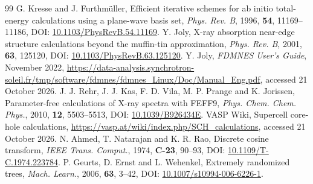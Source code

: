 \begin{thebibliography}{99}
 G. Kresse and J. Furthm\"uller, Efficient iterative schemes for ab initio total-energy calculations using a plane-wave basis set, \textit{Phys. Rev. B}, 1996, \textbf{54}, 11169--11186, DOI: \href{https://doi.org/10.1103/PhysRevB.54.11169}{10.1103/PhysRevB.54.11169}.
 Y. Joly, X-ray absorption near-edge structure calculations beyond the muffin-tin approximation, \textit{Phys. Rev. B}, 2001, \textbf{63}, 125120, DOI: \href{https://doi.org/10.1103/PhysRevB.63.125120}{10.1103/PhysRevB.63.125120}.
 Y. Joly, \textit{FDMNES User's Guide}, November 2022, \url{https://data-analysis.synchrotron-soleil.fr/tmp/software/fdmnes/fdmnes_Linux/Doc/Manual_Eng.pdf}, accessed 21 October 2026.
 J. J. Rehr, J. J. Kas, F. D. Vila, M. P. Prange and K. Jorissen, Parameter-free calculations of X-ray spectra with FEFF9, \textit{Phys. Chem. Chem. Phys.}, 2010, \textbf{12}, 5503--5513, DOI: \href{https://doi.org/10.1039/B926434E}{10.1039/B926434E}.
 VASP Wiki, Supercell core-hole calculations, \url{https://vasp.at/wiki/index.php/SCH_calculations}, accessed 21 October 2026.
 N. Ahmed, T. Natarajan and K. R. Rao, Discrete cosine transform, \textit{IEEE Trans. Comput.}, 1974, \textbf{C-23}, 90--93, DOI: \href{https://doi.org/10.1109/T-C.1974.223784}{10.1109/T-C.1974.223784}.
 P. Geurts, D. Ernst and L. Wehenkel, Extremely randomized trees, \textit{Mach. Learn.}, 2006, \textbf{63}, 3--42, DOI: \href{https://doi.org/10.1007/s10994-006-6226-1}{10.1007/s10994-006-6226-1}.
\end{thebibliography}
